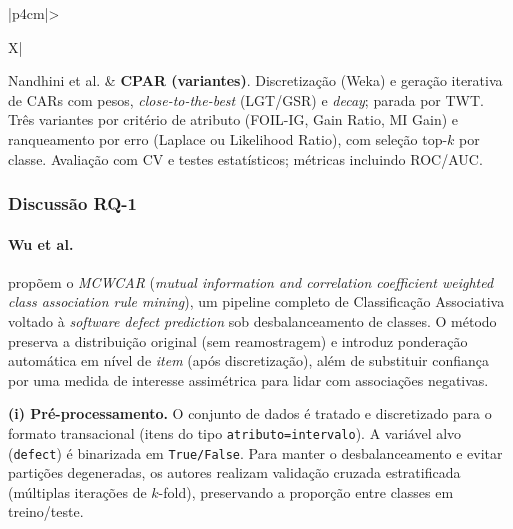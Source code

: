 \begin{xltabular}{\textwidth}{|p{4cm}|>{\raggedright\arraybackslash}X|}
Nandhini et al. \cite{nandhini2020performance} &
\textbf{CPAR (variantes)}. Discretização (Weka) e geração iterativa de CARs com pesos, \textit{close-to-the-best} (LGT/GSR) e \textit{decay}; parada por TWT. Três variantes por critério de atributo (FOIL-IG, Gain Ratio, MI Gain) e ranqueamento por erro (Laplace ou Likelihood Ratio), com seleção top-$k$ por classe. Avaliação com CV e testes estatísticos; métricas incluindo ROC/AUC. \\
\end{xltabular}

\subsubsection{Discussão RQ-1}

\paragraph*{Wu et al.}

 propõem o \textit{MCWCAR} (\textit{mutual information and correlation coefficient weighted class association rule mining}), um pipeline completo de Classificação Associativa voltado à \textit{software defect prediction} sob desbalanceamento de classes. O método preserva a distribuição original (sem reamostragem) e introduz ponderação automática em nível de \textit{item} (após discretização), além de substituir confiança por uma medida de interesse assimétrica para lidar com associações negativas.

\textbf{(i) Pré-processamento.}
O conjunto de dados é tratado e discretizado para o formato transacional (itens do tipo \texttt{atributo=intervalo}). A variável alvo (\texttt{defect}) é binarizada em \texttt{True/False}. Para manter o desbalanceamento e evitar partições degeneradas, os autores realizam validação cruzada estratificada (múltiplas iterações de $k$-fold), preservando a proporção entre classes em treino/teste.

